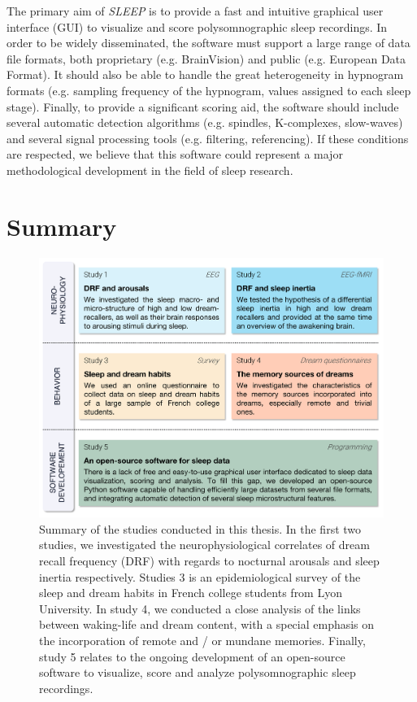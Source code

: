 The primary aim of \textit{SLEEP} is to provide a fast and intuitive graphical user interface (GUI) to visualize and score polysomnographic sleep recordings. In order to be widely disseminated, the software must support a large range of data file formats, both proprietary (e.g. BrainVision) and public (e.g. European Data Format). It should also be able to handle the great heterogeneity in hypnogram formats (e.g. sampling frequency of the hypnogram, values assigned to each sleep stage). Finally, to provide a significant scoring aid, the software should include several automatic detection algorithms (e.g. spindles, K-complexes, slow-waves) and several signal processing tools (e.g. filtering, referencing). If these conditions are respected, we believe that this software could represent a major methodological development in the field of sleep research.

\section{Summary}
\label{sec:problematic:summary}

\begin{figure}[htb]
	\includegraphics[width=\textwidth]{Fig/Intro/Intro_Problematics/Intro_Problematics.png}
	\caption[Summary of the studies conducted in this thesis]{Summary of the studies conducted in this thesis. In the first two studies, we investigated the neurophysiological correlates of dream recall frequency (DRF) with regards to nocturnal arousals and sleep inertia respectively. Studies 3 is an epidemiological survey of the sleep and dream habits in French college students from Lyon University. In study 4, we conducted a close analysis of the links between waking-life and dream content, with a special emphasis on the incorporation of remote and / or mundane memories. Finally, study 5 relates to the ongoing development of an open-source software to visualize, score and analyze polysomnographic sleep recordings.}
	\label{fig:intro:problematics-summary}
\end{figure}

